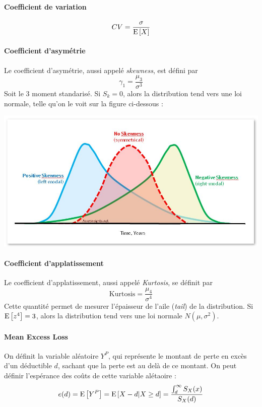 \documentclass[12pt, french]{report}
\begin{document}
\paragraph{Coefficient de variation}
\begin{equation}
CV = \frac{\sigma}{\mathrm{E} \left[ X \right]}
\end{equation}


\paragraph{Coefficient d'asymétrie}
Le coefficient d'asymétrie, aussi appelé \textit{skewness}, est défini par
\begin{equation}
\gamma_1 = \frac{\mu_3}{\sigma^3}
\end{equation}
Soit le 3 moment standarisé. Si $S_k = 0$, alors la distribution tend vers une loi normale, telle qu'on le voit sur la figure ci-dessous : 

\begin{center}
\includegraphics[scale=0.4]{Figures/skewness_interpretation.jpg}
\end{center}

\paragraph{Coefficient d'applatissement}
Le coefficient d'applatissement, aussi appelé \textit{Kurtosis}, se définit par
\begin{equation}
\text{Kurtosis} = \frac{\mu_4}{\sigma^4}
\end{equation}
Cette quantité permet de mesurer l'épaisseur de l'aile (\textit{tail}) de la distribution. Si $\mathrm{E} \left[ z^4 \right] =3$, alors la distribution tend vers une loi normale $N(\mu, \sigma^2)$.

\paragraph{Mean Excess Loss}
On définit la variable aléatoire $Y^P$, qui représente le montant de perte en excès d'un déductible $d$, sachant que la perte est au delà de ce montant. On peut définir l'espérance des coûts de cette variable alétaoire : 
\begin{equation}
e(d) = \mathrm{E} \left[ Y^P \right] = \mathrm{E} \left[ X-d | X \geq d \right] = \frac{\int_{d}^{\infty} S_X(x)}{S_X(d)}
\end{equation}
\end{document}
